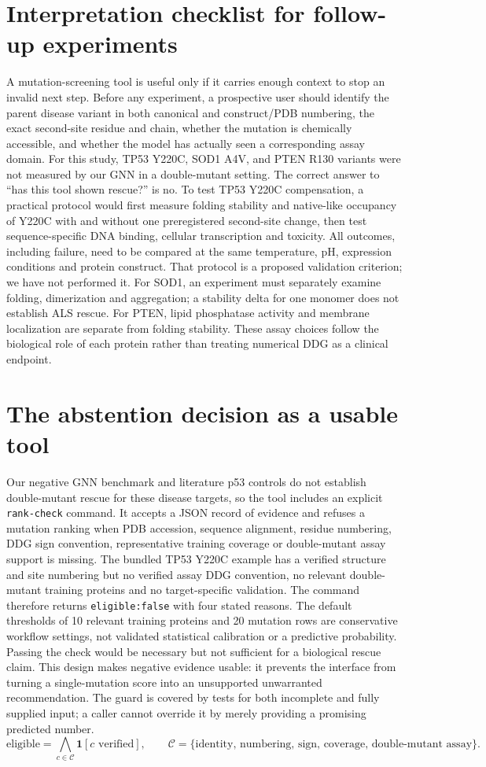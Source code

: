 \documentclass[11pt]{article}
\begin{document}
\section{Interpretation checklist for follow-up experiments}
A mutation-screening tool is useful only if it carries enough context to stop an invalid next step. Before any experiment, a prospective user should identify the parent disease variant in both canonical and construct/PDB numbering, the exact second-site residue and chain, whether the mutation is chemically accessible, and whether the model has actually seen a corresponding assay domain. For this study, TP53 Y220C, SOD1 A4V, and PTEN R130 variants were not measured by our GNN in a double-mutant setting. The correct answer to ``has this tool shown rescue?'' is no. To test TP53 Y220C compensation, a practical protocol would first measure folding stability and native-like occupancy of Y220C with and without one preregistered second-site change, then test sequence-specific DNA binding, cellular transcription and toxicity. All outcomes, including failure, need to be compared at the same temperature, pH, expression conditions and protein construct. That protocol is a proposed validation criterion; we have not performed it. For SOD1, an experiment must separately examine folding, dimerization and aggregation; a stability delta for one monomer does not establish ALS rescue. For PTEN, lipid phosphatase activity and membrane localization are separate from folding stability. These assay choices follow the biological role of each protein rather than treating numerical DDG as a clinical endpoint.
\section{The abstention decision as a usable tool}
Our negative GNN benchmark and literature p53 controls do not establish double-mutant rescue for these disease targets, so the tool includes an explicit \texttt{rank-check} command. It accepts a JSON record of evidence and refuses a mutation ranking when PDB accession, sequence alignment, residue numbering, DDG sign convention, representative training coverage or double-mutant assay support is missing. The bundled TP53 Y220C example has a verified structure and site numbering but no verified assay DDG convention, no relevant double-mutant training proteins and no target-specific validation. The command therefore returns \texttt{eligible:false} with four stated reasons. The default thresholds of 10 relevant training proteins and 20 mutation rows are conservative workflow settings, not validated statistical calibration or a predictive probability. Passing the check would be necessary but not sufficient for a biological rescue claim. This design makes negative evidence usable: it prevents the interface from turning a single-mutation score into an unsupported unwarranted recommendation. The guard is covered by tests for both incomplete and fully supplied input; a caller cannot override it by merely providing a promising predicted number.
\begin{equation}\mathrm{eligible}=\bigwedge_{c\in\mathcal C}\mathbf1[c\text{ verified}],\qquad\mathcal C=\{\text{identity, numbering, sign, coverage, double-mutant assay}\}.\end{equation}
\end{document}
